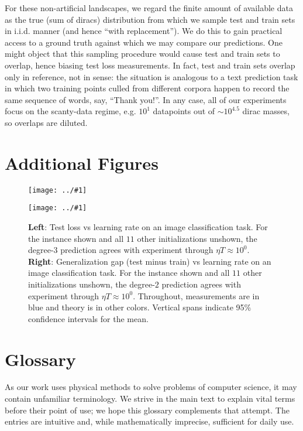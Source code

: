 \documentclass{article}
\theoremstyle{plain}
\theoremstyle{definition}
\newcommand{\plotmoo}[3]{
    \texttt{[image: ../\#1]}
}
\begin{document}
    For these non-artificial landscapes, we regard the finite amount of
    available data as the true (sum of diracs) distribution from which we
    sample test and train sets in i.i.d.  manner (and hence ``with
    replacement'').  We do this to gain practical access to a ground truth
    against which we may compare our predictions.  One might object that this
    sampling procedure would cause test and train sets to overlap, hence
    biasing test loss measurements.  In fact, test and train sets overlap only
    in reference, not in sense: the situation is analogous to a text prediction
    task in which two training points culled from different corpora happen to
    record the same sequence of words, say, ``Thank you!''.  In any case, all
    of our experiments focus on the scanty-data regime, e.g. $10^1$ datapoints
    out of $\sim 10^{4.5}$ dirac masses, so overlaps are diluted. 

\section{Additional Figures}\label{sect:figures}

    \begin{figure}[H]
        \centering
        \plotmoo{plots/test-vanilla-fashion}{0.48\columnwidth}{3.0cm} 
        \plotmoo{plots/gen-cifar}{0.48\columnwidth}{3.0cm}
        \caption{
            {\bf Left}: Test loss vs learning rate on an image
            classification task.  For the instance shown and all $11$ other
            initializations unshown, the degree-$3$ prediction agrees with
            experiment through $\eta T \approx 10^0$.
            {\bf Right}:
            Generalization gap (test minus train) vs learning rate on an
            image classification task.  For the instance shown and all $11$
            other initializations unshown, the degree-$2$ prediction agrees
            with experiment through $\eta T \approx 10^0$.  Throughout,
            measurements are in blue and theory is in other colors.
            Vertical spans indicate 95\% confidence intervals for the mean.
        }
    \end{figure}


\section{Glossary}\label{sect:glossary}

    As our work uses physical methods to solve problems of computer science, it
    may contain unfamiliar terminology.  We strive in the main text to explain
    vital terms before their point of use; we hope this glossary complements
    that attempt.  The entries are intuitive and, while mathematically
    imprecise, sufficient for daily use.
\end{document}
